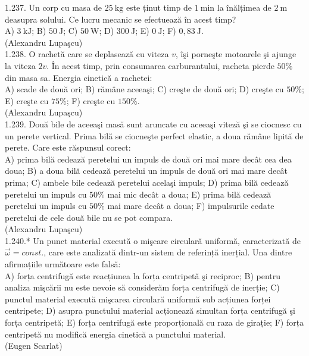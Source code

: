 {1.237. Un corp cu masa de $25 \mathrm{~kg}$ este ținut timp de $1 \mathrm{~min}$ la înălțimea de $2 \mathrm{~m}$ deasupra solului. Ce lucru mecanic se efectuează în acest timp?\\ A) $3 \mathrm{~kJ}$; B) $50 \mathrm{~J}$; C) $50 \mathrm{~W}$; D) $300 \mathrm{~J}$; E) $0 \mathrm{~J}$; F) $0,83 \mathrm{~J}$.\\ (Alexandru Lupaşcu)\\

1.238. O rachetă care se deplasează cu viteza $v$, îşi porneşte motoarele şi ajunge la viteza $2 v$. În acest timp, prin consumarea carburantului, racheta pierde $50 \%$ din masa sa. Energia cinetică a rachetei:\\ A) scade de două ori; B) rămâne aceeaşi; C) creşte de două ori; D) creşte cu $50 \%$; E) creşte cu $75 \%$; F) creşte cu $150 \%$.\\ (Alexandru Lupaşcu)\\

1.239. Două bile de aceeaşi masă sunt aruncate cu aceeaşi viteză şi se ciocnesc cu un perete vertical. Prima bilă se ciocneşte perfect elastic, a doua rămâne lipită de perete. Care este răspunsul corect:\\ A) prima bilă cedează peretelui un impuls de două ori mai mare decât cea dea doua; B) a doua bilă cedează peretelui un impuls de două ori mai mare decât prima; C) ambele bile cedează peretelui acelaşi impuls; D) prima bilă cedează peretelui un impuls cu $50 \%$ mai mic decât a doua; E) prima bilă cedează peretelui un impuls cu $50 \%$ mai mare decât a doua; F) impulsurile cedate peretelui de cele două bile nu se pot compara.\\ (Alexandru Lupaşcu)\\

1.240.* Un punct material execută o mişcare circulară uniformă, caracterizată de $\vec{\omega}=const.$, care este analizată dintr-un sistem de referință inerțial. Una dintre afirmațiile următoare este falsă:\\ A) forța centrifugă este reacțiunea la forța centripetă şi reciproc; B) pentru analiza mişcării nu este nevoie să considerăm forța centrifugă de inerție; C) punctul material execută mişcarea circulară uniformă sub acțiunea forței centripete; D) asupra punctului material acționează simultan forța centrifugă şi forța centripetă; E) forța centrifugă este proporțională cu raza de girație; F) forța centripetă nu modifică energia cinetică a punctului material.\\ (Eugen Scarlat)\\

}
